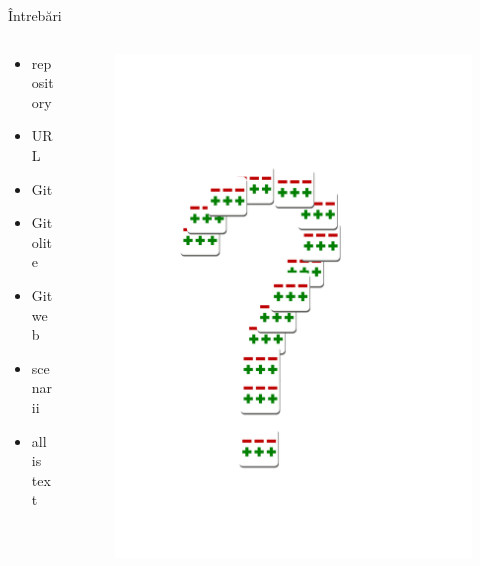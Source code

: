 \documentclass{beamer}
\begin{document}
\begin{frame}{Întrebări}
	\begin{columns}
		\begin{column}[l]{0.5\textwidth}
			\begin{itemize}
				\item repository
                \item URL
                \item Git
                \item Gitolite
                \item Gitweb
                \item scenarii
                \item all is text
			\end{itemize}
		\end{column}
		\begin{column}[l]{0.5\textwidth}
			\begin{figure}
				\centering
				\includegraphics[width=0.5\columnwidth]{img/question-mark}
			\end{figure}
		\end{column}
	\end{columns}
\end{frame}
\end{document}
